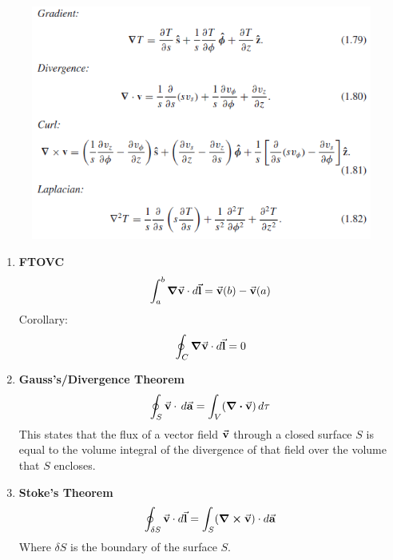 \documentclass[12pt, oneside]{book}
\begin{document}
\begin{itemize}
\begin{figure}[h]
	\includegraphics{operators_cyl.png}
\end{figure}



\begin{tcolorbox}[colback=red!5,colframe=red!75!black,title=\textbf{Theorems of Vector Calculus}]
	\begin{enumerate}
		\item \textbf{FTOVC}
		\begin{equation}
			\int_{a}^{b}\grad{\va{v}}\cdot d\va{l}=\va{v}(b)-\va{v}(a)
		\end{equation}
		Corollary: 
		\begin{equation}
			\oint_C \grad{\va{v}}\cdot d\va{l}=0
		\end{equation}
		\item \textbf{Gauss's/Divergence Theorem} 
		\begin{equation}
		 \oint_S \va{v}\cdot \,d\va{a}=\int_V (\div{\va{v}})\, d\tau
		\end{equation}
	This states that the flux of a vector field $\va{v}$ through a closed surface $S$ is equal to the volume integral of the divergence of that field over the volume that $S$ encloses.
	
	\item \textbf{Stoke's Theorem}
	\begin{equation}
		\oint_{\delta S}\va{v}\cdot d\va{l}=\int_S (\curl{\va{v}})\cdot d\va{a}
	\end{equation}
Where $\delta S$ is the boundary of the surface $S$.
	\end{enumerate}
\end{tcolorbox}


\end{itemize}
\end{document}

